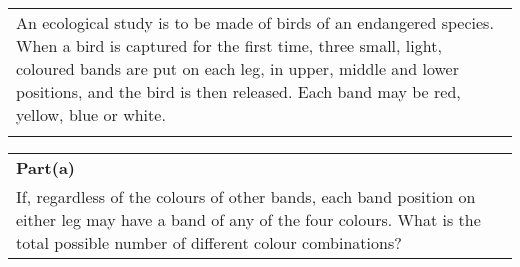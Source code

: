\documentclass[a4paper,12pt]{article}
\begin{document}
\large
\begin{table}[ht!]
     \centering
     \begin{tabular}{|p{15cm}|}
     \hline        \large
\noindent An ecological study is to be made of birds of an endangered species. When a bird is captured for the first time, three small, light, coloured bands are put on each leg, in upper, middle and lower positions, and the bird is then released.  Each band may be red, yellow, blue or white. \\
\\ \hline
      \end{tabular}
    \end{table}
    
  \begin{table}[ht!]
     \centering
     \begin{tabular}{|p{15cm}|}
     \hline  \large
\noindent \textbf{Part(a)}\\ \smallskip \large
If, regardless of the colours of other bands, each band position on either leg may have a band of any of the four colours. What is the total possible number of different colour combinations?     \smallskip 
 \\ \hline 
      \end{tabular}
    \end{table}

\bigskip
\end{document}

